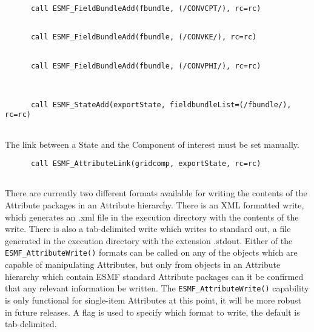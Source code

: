 
 \begin{verbatim}
      call ESMF_FieldBundleAdd(fbundle, (/CONVCPT/), rc=rc)
 
\end{verbatim}
 

 \begin{verbatim}
      call ESMF_FieldBundleAdd(fbundle, (/CONVKE/), rc=rc)
 
\end{verbatim}
 

 \begin{verbatim}
      call ESMF_FieldBundleAdd(fbundle, (/CONVPHI/), rc=rc)
 
\end{verbatim}
 

 \begin{verbatim}

      call ESMF_StateAdd(exportState, fieldbundleList=(/fbundle/), rc=rc)
 
\end{verbatim}
 

       The link between a State and the Component of interest must be
       set manually. 

 \begin{verbatim}
      call ESMF_AttributeLink(gridcomp, exportState, rc=rc)
 
\end{verbatim}
 

       There are currently two different formats available for writing
       the contents of the Attribute packages in an Attribute hierarchy.
       There is an XML formatted write, which generates an .xml file in the
       execution directory with the contents of the write.  There is also
       a tab-delimited write which writes to standard out, a file generated
       in the execution directory with the extension .stdout.  Either of
       the {\tt ESMF\_AttributeWrite()} formats can be called on any of the objects which
       are capable of manipulating Attributes, but only from objects in an
       Attribute hierarchy which contain ESMF standard Attribute packages can it be confirmed that any
       relevant information be written.  The {\tt ESMF\_AttributeWrite()}
       capability is only functional for single-item Attributes at this point, it
       will be more robust in future releases.  A flag is used to
       specify which format to write, the default is tab-delimited. 

